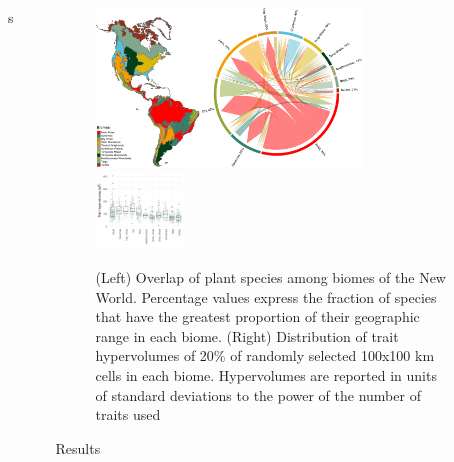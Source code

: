 \documentclass[final]{beamer}
\newlength{\sepwid}
\newlength{\onecolwid}
\newlength{\twocolwid}
\begin{document}
\begin{frame}[t]
\begin{columns}[t]
\begin{column}{\onecolwid}
    \end{column}s



    \begin{column}{\sepwid}\end{column}			%
    \begin{column}{\twocolwid}							%

\begin{figure}[h]
	\centering
	\includegraphics[width=0.75\textwidth]{./figures/Figure1.pdf}
	~
	\includegraphics[width=0.25\textwidth]{./figures/Hypervolume_sp_sample_gaussian20perc.pdf}
	\caption{ \footnotesize (Left) Overlap of plant species among biomes of the New World. Percentage values express the fraction of species that have the greatest proportion of their geographic range in each biome. (Right) Distribution of trait hypervolumes of 20\% of randomly selected 100x100 km cells in each biome. Hypervolumes are reported in units of standard deviations to the power of the number of traits used}
	\label{fig:map}
\end{figure}



\begin{block}{Results}

\end{block}
		 
\begin{multicols}{2}


\end{multicols}
\end{column}
\end{columns}
\end{frame}
\end{document}
